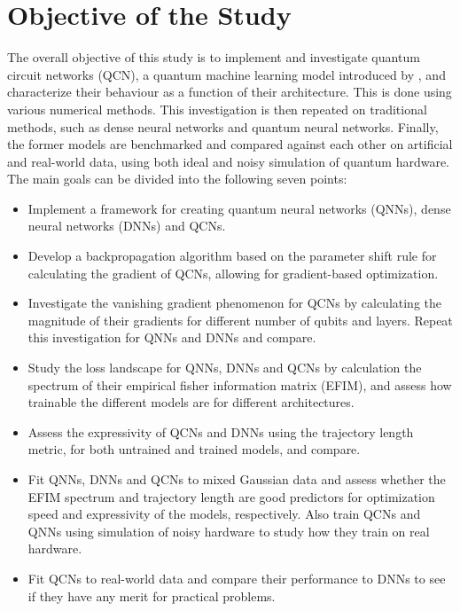 \section{Objective of the Study}
The overall objective of this study is to implement and investigate quantum circuit networks (QCN), a quantum machine learning model introduced by \citet{stian}, and characterize their behaviour as a function of their architecture. This is done using various numerical methods. This investigation is then repeated on traditional methods, such as dense neural networks and quantum neural networks. Finally, the former models are benchmarked and compared against each other on artificial and real-world data, using both ideal and noisy simulation of quantum hardware. The main goals can be divided into the following seven points:

\begin{itemize}
    \item Implement a framework for creating quantum neural networks (QNNs), dense neural networks (DNNs) and QCNs.
    
    \item Develop a backpropagation algorithm based on the parameter shift rule for calculating the gradient of QCNs, allowing for gradient-based optimization. 
    
    \item Investigate the vanishing gradient phenomenon for QCNs by calculating the magnitude of their gradients for different number of qubits and layers. Repeat this investigation for QNNs and DNNs and compare.
    
    \item Study the loss landscape for QNNs, DNNs and QCNs by calculation the spectrum of their empirical fisher information matrix (EFIM), and assess how trainable the different models are for different architectures.
    
    \item Assess the expressivity of QCNs and DNNs using the trajectory length metric, for both untrained and trained models, and compare. 
    
    \item Fit QNNs, DNNs and QCNs to mixed Gaussian data and assess whether the EFIM spectrum and trajectory length are good predictors for optimization speed and expressivity of the models, respectively. Also train QCNs and QNNs using simulation of noisy hardware to study how they train on real hardware.
    
    \item Fit QCNs to real-world data and compare their performance to DNNs to see if they have any merit for practical problems. 
\end{itemize}